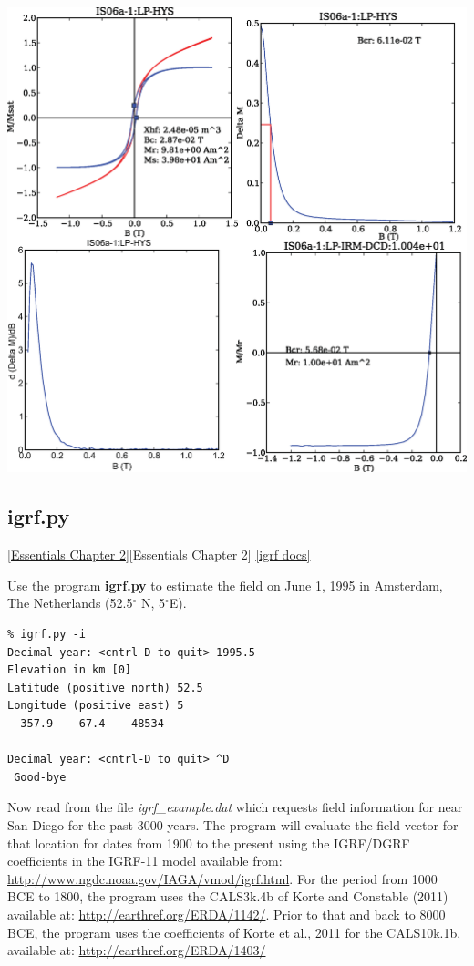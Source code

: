 \documentclass[11pt]{book}
\begin{document}
{{{  \includegraphics[width=15cm]{EPSfiles/hysteresis-magic.eps}




\subsection{igrf.py} 
\href{http://magician.ucsd.edu/Essentials_2/WebBook2ch2.html#ch2}{[Essentials Chapter 2]}[Essentials Chapter 2]
\href{http://earthref.org/PmagPy/pmagpydocs/igrf-module.html}{[igrf docs]}

Use the program {\bf igrf.py } to estimate the
field on June 1, 1995 in Amsterdam, The Netherlands (52.5$^{\circ}$ N, 5$^{\circ}$E).

\begin{verbatim}
% igrf.py -i
Decimal year: <cntrl-D to quit> 1995.5
Elevation in km [0] 
Latitude (positive north) 52.5
Longitude (positive east) 5
  357.9    67.4    48534
  
Decimal year: <cntrl-D to quit> ^D
 Good-bye
\end{verbatim}

Now read from the file {\it igrf\_example.dat} which requests field information for near San Diego for the past 3000 years.  The program will evaluate the field vector for that location for dates from 1900 to the present using the IGRF/DGRF coefficients in the IGRF-11 model available from:
\url{http://www.ngdc.noaa.gov/IAGA/vmod/igrf.html}.   For the period from 1000 BCE to 1800, the program uses the CALS3k.4b of Korte and Constable (2011) \nocite{korte11a} available at: \url{http://earthref.org/ERDA/1142/}.    Prior to that and back to 8000 BCE, the program uses the coefficients of Korte et al., 2011 \nocite{korte11b} for the CALS10k.1b, available at:
\url{http://earthref.org/ERDA/1403/}

}}}
\end{document}
